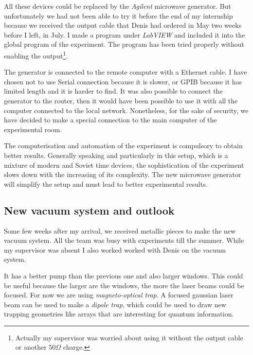\documentclass[twoside, open=right
]{scrreprt}
\newcommand{\Om}{\Omega}
\begin{document}
\par All these devices could be replaced by the \emph{Agilent} microwave generator. But unfortunately we had not been able to try it before the end of my internship because we received the output cable that Denis had ordered in May two weeks before I left, in July. I made a program under \emph{LabVIEW} and included it into the global program of the experiment. The program has been tried properly without enabling the output\footnote{Actually my supervisor was worried about using it without the output cable or another $50\Om$ charge.}.

\par The generator is connected to the remote computer with a Ethernet cable. I have chosen not to use Serial connection because it is slower, or GPIB because it has limited length and it is harder to find. It was also possible to connect the generator to the router, then it would have been possible to use it with all the computer connected to the local network. Nonetheless, for the sake of security, we have decided to make a special connection to the main computer of the experimental room.

\par The computerisation and automation of the experiment is compulsory to obtain better results. Generally speaking and particularly in this setup, which is a mixture of modern and Soviet time devices, the sophistication of the experiment slows down with the increasing of its complexity. The new microwave generator will simplify the setup and must lead to better experimental results.

\subsection{New vacuum system and outlook}

\par Some few weeks after my arrival, we received metallic pieces to make the new vacuum system. All the team was busy with experiments till the summer. While my supervisor was absent I also worked worked with Denis on the vacuum system.

\par It has a better pump than the previous one and also larger windows. This could be useful because the larger are the windows, the more the laser beams could be focused. For now we are using \emph{magneto-optical trap}. A focused gaussian laser beam can be used to make a \emph{dipole trap}, which could be used to draw new trapping geometries like arrays that are interesting for quantum information. 
\end{document}

